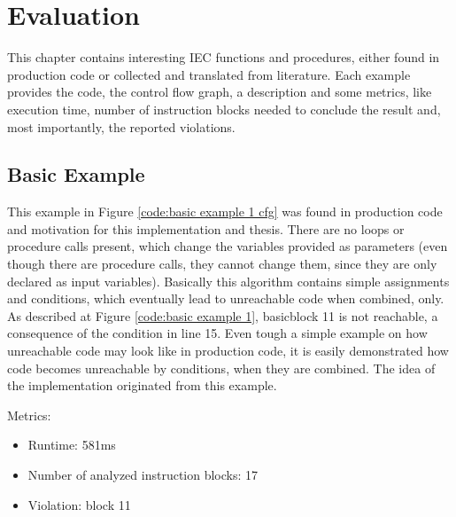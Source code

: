 
\chapter {Evaluation}
\label {cha:evaluation}
This chapter contains interesting IEC functions and procedures, either found in production code or collected and translated from literature.
Each example provides the code, the control flow graph, a description and some metrics, like execution time, number of instruction blocks needed to conclude the result and, most importantly, the reported violations.


\section{Basic Example}
This example in Figure \ref{code:basic example 1 cfg} was found in production code and motivation for this implementation and thesis. There are no loops or procedure calls present, which change the variables provided as parameters (even though there are procedure calls, they cannot change them, since they are only declared as input variables).
Basically this algorithm contains simple assignments and conditions, which eventually lead to unreachable code when combined, only.
As described at Figure \ref{code:basic example 1}, basicblock 11 is not reachable, a consequence of the condition in line 15.
Even tough a simple example on how unreachable code may look like in production code, it is easily demonstrated how code becomes unreachable by conditions, when they are combined.
The idea of the implementation originated from this example.

Metrics:
\begin{itemize}
	\item Runtime: 581ms
	\item Number of analyzed instruction blocks: 17
	\item Violation: block 11
\end{itemize}


